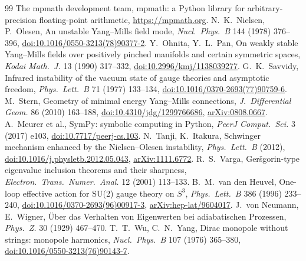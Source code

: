 \documentclass[11pt]{article}
\theoremstyle{definition}
\theoremstyle{remark}
\begin{document}
\begin{thebibliography}{99}
 The mpmath development team, mpmath: a Python library for arbitrary-precision floating-point arithmetic, \url{https://mpmath.org}.
 N.~K.~Nielsen, P.~Olesen, An unstable Yang--Mills field mode, \emph{Nucl.\ Phys.\ B} 144 (1978) 376--396, \href{https://doi.org/10.1016/0550-3213(78)90377-2}{doi:10.1016/0550-3213(78)90377-2}.
 Y.~Ohnita, Y.~L.~Pan, On weakly stable Yang--Mills fields over positively pinched manifolds and certain symmetric spaces, \emph{Kodai Math.\ J.} 13 (1990) 317--332, \href{https://doi.org/10.2996/kmj/1138039277}{doi:10.2996/kmj/1138039277}.
 G.~K.~Savvidy, Infrared instability of the vacuum state of gauge theories and asymptotic freedom, \emph{Phys.\ Lett.\ B} 71 (1977) 133--134, \href{https://doi.org/10.1016/0370-2693(77)90759-6}{doi:10.1016/0370-2693(77)90759-6}.
 M.~Stern, Geometry of minimal energy Yang--Mills connections, \emph{J.\ Differential Geom.} 86 (2010) 163--188, \href{https://doi.org/10.4310/jdg/1299766686}{doi:10.4310/jdg/1299766686}, \href{https://arxiv.org/abs/0808.0667}{arXiv:0808.0667}.
 A.~Meurer et al., SymPy: symbolic computing in Python, \emph{PeerJ Comput.\ Sci.} 3 (2017) e103, \href{https://doi.org/10.7717/peerj-cs.103}{doi:10.7717/peerj-cs.103}.
 N.~Tanji, K.~Itakura, Schwinger mechanism enhanced by the Nielsen--Olesen instability, \emph{Phys.\ Lett.\ B} (2012), \href{https://doi.org/10.1016/j.physletb.2012.05.043}{doi:10.1016/j.physletb.2012.05.043}, \href{https://arxiv.org/abs/1111.6772}{arXiv:1111.6772}.
 R.~S.~Varga, Ger\v{s}gorin-type eigenvalue inclusion theorems and their sharpness, \emph{Electron.\ Trans.\ Numer.\ Anal.} 12 (2001) 113--133.
 B.~M.~van den Heuvel, One-loop effective action for SU(2) gauge theory on $S^3$, \emph{Phys.\ Lett.\ B} 386 (1996) 233--240, \href{https://doi.org/10.1016/0370-2693(96)00917-3}{doi:10.1016/0370-2693(96)00917-3}, \href{https://arxiv.org/abs/hep-lat/9604017}{arXiv:hep-lat/9604017}.
 J.~von Neumann, E.~Wigner, \"Uber das Verhalten von Eigenwerten bei adiabatischen Prozessen, \emph{Phys.\ Z.} 30 (1929) 467--470.
 T.~T.~Wu, C.~N.~Yang, Dirac monopole without strings: monopole harmonics, \emph{Nucl.\ Phys.\ B} 107 (1976) 365--380, \href{https://doi.org/10.1016/0550-3213(76)90143-7}{doi:10.1016/0550-3213(76)90143-7}.
\end{thebibliography}
\end{document}
